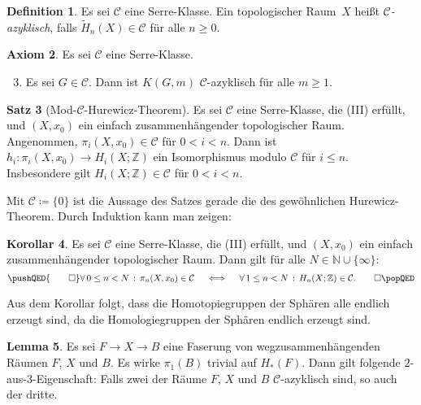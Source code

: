 \documentclass[11pt, a4paper, german]{article}
\theoremstyle{definition}
\newtheorem{lem}{Lemma}
\newtheorem{satz}[lem]{Satz}
\newtheorem{defn}[lem]{Definition}
\newtheorem{kor}[lem]{Korollar}
\newtheorem{axiom}[lem]{Axiom}
\theoremstyle{remark}
\newcommand{\N}{\mathbb{N}} %
\newcommand{\Z}{\mathbb{Z}} %
\newcommand{\fa}[1]{\forall \, {#1} \,:\,}
\newcommand{\SC}{\mathcal{C}} %
\begin{document}
\begin{defn}
  Es sei $\SC$ eine Serre-Klasse.
  Ein topologischer Raum~$X$ heißt \emph{$\SC$-azyklisch}, falls $\widetilde{H}_n(X) \in \SC$ für alle $n \geq 0$.
\end{defn}

\begin{axiom}
  Es sei $\SC$ eine Serre-Klasse.
  \begin{enumerate}[label=(\Roman*)]
    \setcounter{enumi}{2}
    \item Es sei $G \in \SC$.
    Dann ist $K(G, m)$ $\SC$-azyklisch für alle $m \geq 1$.
  \end{enumerate}
\end{axiom}

\begin{satz}[Mod-$\SC$-Hurewicz-Theorem]\label{hurewicz-mod-c}
  Es sei $\SC$ eine Serre-Klasse, die (III) erfüllt, und
  $(X, x_0)$ ein einfach zusammenhängender topologischer Raum.
  Angenommen, $\pi_i(X, x_0) \in \SC$ für $0 < i < n$.
  Dann ist $h_i : \pi_i(X, x_0) \to H_i(X; \Z)$ ein Isomorphismus modulo $\SC$ für $i \leq n$.
  Insbesondere gilt $H_i(X; \Z) \in \SC$ für $0 < i < n$.
\end{satz}

Mit $\SC \coloneqq \{ 0 \}$ ist die Aussage des Satzes gerade die des gewöhnlichen Hurewicz-Theorem.
Durch Induktion kann man zeigen:

\begin{kor}\label{homotopy-in-c-iff-homology-in-c}
  Es sei $\SC$ eine Serre-Klasse, die (III) erfüllt, und
  $(X, x_0)$ ein einfach zusammenhängender topologischer Raum.
  Dann gilt für alle $N \in \N \cup \{ \infty \}$:
  \[
    \pushQED{\qed} 
    \fa{0 \leq n < N} \pi_n(X, x_0) \in \SC
    \quad \iff \quad
    \fa{1 \leq n < N} H_n(X; \Z) \in \SC.
    \qedhere
    \popQED
  \]
\end{kor}

Aus dem Korollar folgt, dass die Homotopiegruppen der Sphären alle endlich erzeugt sind, da die Homologiegruppen der Sphären endlich erzeugt sind.

\begin{lem}\label{two-of-three}
  Es sei $F \to X \to B$ eine Faserung von wegzusammenhängenden Räumen $F$, $X$ und $B$.
  Es wirke $\pi_1(B)$ trivial auf $H_*(F)$.
  Dann gilt folgende $2$-aus-$3$-Eigenschaft: Falls zwei der Räume $F$, $X$ und $B$ $\SC$-azyklisch sind, so auch der dritte.
\end{lem}
\end{document}
